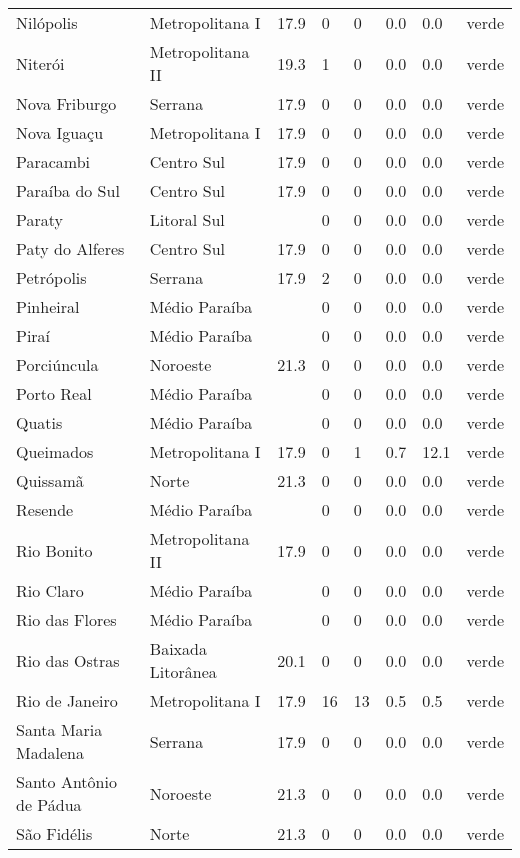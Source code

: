 \begin{longtable}{l|lllllll}
  Nilópolis & Metropolitana I & 17.9 & 0 & 0 & 0.0 & 0.0 & verde \\ 
  Niterói & Metropolitana II & 19.3 & 1 & 0 & 0.0 & 0.0 & verde \\ 
  Nova Friburgo & Serrana & 17.9 & 0 & 0 & 0.0 & 0.0 & verde \\ 
  Nova Iguaçu & Metropolitana I & 17.9 & 0 & 0 & 0.0 & 0.0 & verde \\ 
  Paracambi & Centro Sul & 17.9 & 0 & 0 & 0.0 & 0.0 & verde \\ 
  Paraíba do Sul & Centro Sul & 17.9 & 0 & 0 & 0.0 & 0.0 & verde \\ 
  Paraty & Litoral Sul &  & 0 & 0 & 0.0 & 0.0 & verde \\ 
  Paty do Alferes & Centro Sul & 17.9 & 0 & 0 & 0.0 & 0.0 & verde \\ 
  Petrópolis & Serrana & 17.9 & 2 & 0 & 0.0 & 0.0 & verde \\ 
  Pinheiral & Médio Paraíba &  & 0 & 0 & 0.0 & 0.0 & verde \\ 
  Piraí & Médio Paraíba &  & 0 & 0 & 0.0 & 0.0 & verde \\ 
  Porciúncula & Noroeste & 21.3 & 0 & 0 & 0.0 & 0.0 & verde \\ 
  Porto Real & Médio Paraíba &  & 0 & 0 & 0.0 & 0.0 & verde \\ 
  Quatis & Médio Paraíba &  & 0 & 0 & 0.0 & 0.0 & verde \\ 
  Queimados & Metropolitana I & 17.9 & 0 & 1 & 0.7 & 12.1 & verde \\ 
  Quissamã & Norte & 21.3 & 0 & 0 & 0.0 & 0.0 & verde \\ 
  Resende & Médio Paraíba &  & 0 & 0 & 0.0 & 0.0 & verde \\ 
  Rio Bonito & Metropolitana II & 17.9 & 0 & 0 & 0.0 & 0.0 & verde \\ 
  Rio Claro & Médio Paraíba &  & 0 & 0 & 0.0 & 0.0 & verde \\ 
  Rio das Flores & Médio Paraíba &  & 0 & 0 & 0.0 & 0.0 & verde \\ 
  Rio das Ostras & Baixada Litorânea & 20.1 & 0 & 0 & 0.0 & 0.0 & verde \\ 
  Rio de Janeiro & Metropolitana I & 17.9 & 16 & 13 & 0.5 & 0.5 & verde \\ 
  Santa Maria Madalena & Serrana & 17.9 & 0 & 0 & 0.0 & 0.0 & verde \\ 
  Santo Antônio de Pádua & Noroeste & 21.3 & 0 & 0 & 0.0 & 0.0 & verde \\ 
  São Fidélis & Norte & 21.3 & 0 & 0 & 0.0 & 0.0 & verde \\ 

\end{longtable}
